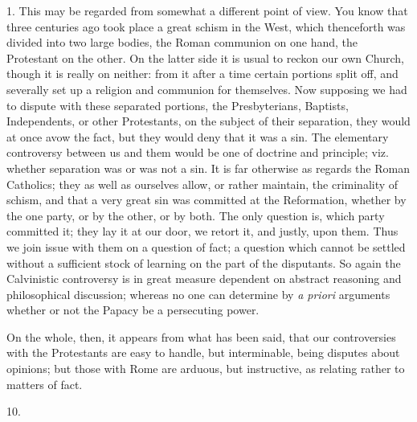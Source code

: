 1. This may be regarded from somewhat a different point of view.
You know that three centuries ago took place a great schism in the
West, which thenceforth was divided into two large bodies, the Roman
communion on one hand, the Protestant on the other. On the latter side
it is usual to reckon our own Church, though it is really on neither:
from it after a time certain portions split off, and severally set up
a religion and communion for themselves. Now supposing we had to
dispute with these separated portions, the Presbyterians, Baptists,
Independents, or other Protestants, on the subject of their
separation, they would at once avow the fact, but they would deny that
it was a sin. The elementary controversy between us and them would be
one of doctrine and principle; viz. whether separation was or was not
a sin. It is far otherwise as regards the Roman Catholics; they as
well as ourselves allow, or rather maintain, the criminality of
schism, and that a very great sin was committed at the Reformation,
whether by the one party, or by the other, or by both. The only
question is, which party committed it; they lay it at our door, we
retort it, and justly, upon them. Thus we join issue with them on a
question of fact; a question which cannot be settled without a
sufficient stock of learning on the part of the disputants. So again
the Calvinistic controversy is in great measure dependent on abstract
reasoning and philosophical discussion; whereas no one can determine
by \emph{a priori} arguments whether or not the Papacy be a
persecuting power.

On the whole, then, it appears from what has been said, that our
controversies with the Protestants are easy to handle, but
interminable, being disputes about opinions; but those with Rome
are arduous, but instructive, as relating rather to matters of fact.

10.


